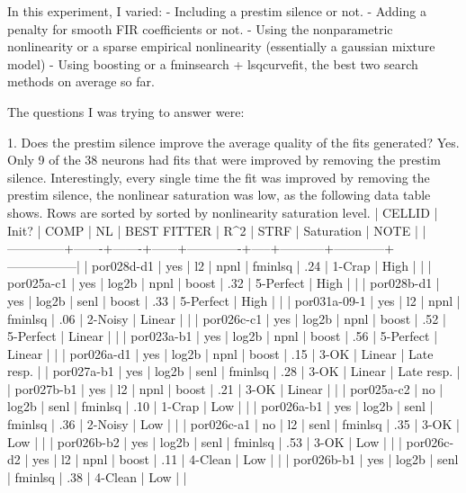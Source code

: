 In this experiment, I varied:
- Including a prestim silence or not.
- Adding a penalty for smooth FIR coefficients or not. 
- Using the nonparametric nonlinearity or a sparse empirical nonlinearity (essentially a gaussian mixture model)
- Using boosting or a fminsearch + lsqcurvefit, the best two search methods on average so far. 

The questions I was trying to answer were:

1. Does the prestim silence improve the average quality of the fits generated?   
   Yes. Only 9 of the 38 neurons had fits that were improved by removing the prestim silence. Interestingly, every single time the fit was improved by removing the prestim silence, the nonlinear saturation was low, as the following data table shows. Rows are sorted by sorted by nonlinearity saturation level. 
     | CELLID       | Init? | COMP  | NL   | BEST FITTER | R^2 | STRF      | Saturation | NOTE            |
     |--------------+-------+-------+------+-------------+-----+-----------+------------+-----------------|
     | por028d-d1   | yes   | l2    | npnl | fminlsq     | .24 | 1-Crap    | High       |                 |
     | por025a-c1   | yes   | log2b | npnl | boost       | .32 | 5-Perfect | High       |                 |
     | por028b-d1   | yes   | log2b | senl | boost       | .33 | 5-Perfect | High       |                 |
     | por031a-09-1 | yes   | l2    | npnl | fminlsq     | .06 | 2-Noisy   | Linear     |                 |
     | por026c-c1   | yes   | log2b | npnl | boost       | .52 | 5-Perfect | Linear     |                 |
     | por023a-b1   | yes   | log2b | npnl | boost       | .56 | 5-Perfect | Linear     |                 |
     | por026a-d1   | yes   | log2b | npnl | boost       | .15 | 3-OK      | Linear     | Late resp.      |
     | por027a-b1   | yes   | log2b | senl | fminlsq     | .28 | 3-OK      | Linear     | Late resp.      |
     | por027b-b1   | yes   | l2    | npnl | boost       | .21 | 3-OK      | Linear     |                 |
     | por025a-c2   | no    | log2b | senl | fminlsq     | .10 | 1-Crap    | Low        |                 |
     | por026a-b1   | yes   | log2b | senl | fminlsq     | .36 | 2-Noisy   | Low        |                 |
     | por026c-a1   | no    | l2    | senl | fminlsq     | .35 | 3-OK      | Low        |                 |
     | por026b-b2   | yes   | log2b | senl | fminlsq     | .53 | 3-OK      | Low        |                 |
     | por026c-d2   | yes   | l2    | npnl | boost       | .11 | 4-Clean   | Low        |                 |
     | por026b-b1   | yes   | log2b | senl | fminlsq     | .38 | 4-Clean   | Low        |                 |
